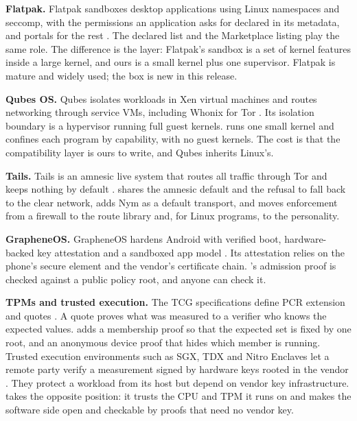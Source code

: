 \textbf{Flatpak.} Flatpak sandboxes desktop applications using Linux namespaces and seccomp, with the permissions an application asks for declared in its metadata, and portals for the rest \cite{flatpak}. The declared list and the Marketplace listing play the same role. The difference is the layer: Flatpak's sandbox is a set of kernel features inside a large kernel, and ours is a small kernel plus one supervisor. Flatpak is mature and widely used; the \nonos{} box is new in this release.

\textbf{Qubes OS.} Qubes isolates workloads in Xen virtual machines and routes networking through service VMs, including Whonix for Tor \cite{qubes}. Its isolation boundary is a hypervisor running full guest kernels. \nonos{} runs one small kernel and confines each program by capability, with no guest kernels. The cost is that the compatibility layer is ours to write, and Qubes inherits Linux's.

\textbf{Tails.} Tails is an amnesic live system that routes all traffic through Tor and keeps nothing by default \cite{tails}. \nonos{} shares the amnesic default and the refusal to fall back to the clear network, adds Nym as a default transport, and moves enforcement from a firewall to the route library and, for Linux programs, to the personality.

\textbf{GrapheneOS.} GrapheneOS hardens Android with verified boot, hardware-backed key attestation and a sandboxed app model \cite{graphene}. Its attestation relies on the phone's secure element and the vendor's certificate chain. \nonos{}'s admission proof is checked against a public policy root, and anyone can check it.

\textbf{TPMs and trusted execution.} The TCG specifications define PCR extension and quotes \cite{tcgpc,tcgtpm}. A quote proves what was measured to a verifier who knows the expected values. \nonos{} adds a membership proof so that the expected set is fixed by one root, and an anonymous device proof that hides which member is running. Trusted execution environments such as SGX, TDX and Nitro Enclaves let a remote party verify a measurement signed by hardware keys rooted in the vendor \cite{sgx,tdx,nitro}. They protect a workload from its host but depend on vendor key infrastructure. \nonos{} takes the opposite position: it trusts the CPU and TPM it runs on and makes the software side open and checkable by proofs that need no vendor key.
